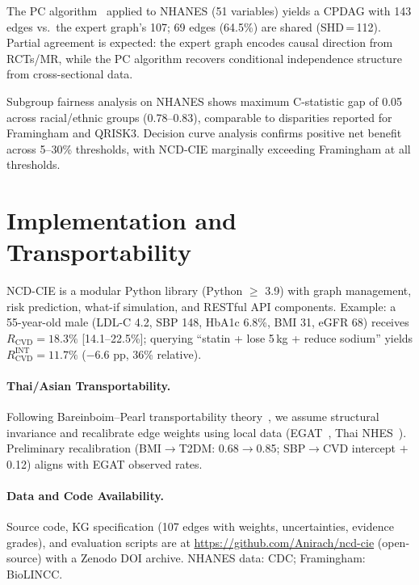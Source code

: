 \documentclass[runningheads]{llncs}
\begin{document}
The PC algorithm~\cite{spirtes2000causation} applied to NHANES
(51 variables) yields a CPDAG with 143 edges vs.\ the expert graph's
107; 69 edges (64.5\%) are shared (SHD\,=\,112).
Partial agreement is expected: the expert graph encodes causal
direction from RCTs/MR, while the PC algorithm recovers conditional
independence structure from cross-sectional data.

Subgroup fairness analysis on NHANES shows maximum C-statistic gap of
0.05 across racial/ethnic groups (0.78--0.83), comparable to
disparities reported for Framingham and QRISK3.
Decision curve analysis confirms positive net benefit across
5--30\% thresholds, with NCD-CIE marginally exceeding Framingham
at all thresholds.

\section{Implementation and Transportability}\label{sec:impl}

NCD-CIE is a modular Python library (Python $\geq$ 3.9) with
graph management, risk prediction, what-if simulation, and RESTful
API components.
Example: a 55-year-old male (LDL-C 4.2, SBP 148, HbA1c 6.8\%, BMI
31, eGFR 68) receives $R_{\text{CVD}} = 18.3\%$ [14.1--22.5\%];
querying ``statin + lose 5\,kg + reduce sodium'' yields
$R_{\text{CVD}}^{\text{INT}} = 11.7\%$ ($-$6.6 pp, 36\% relative).

\paragraph{Thai/Asian Transportability.}
Following Bareinboim--Pearl transportability
theory~\cite{bareinboim2016causal}, we assume structural invariance
and recalibrate edge weights using local data
(EGAT~\cite{sritara2003egat}, Thai NHES~\cite{aekplakorn2011thai}).
Preliminary recalibration (BMI$\to$T2DM: 0.68$\to$0.85;
SBP$\to$CVD intercept $+$0.12) aligns with EGAT observed rates.

\paragraph{Data and Code Availability.}
Source code, KG specification (107 edges with weights, uncertainties,
evidence grades), and evaluation scripts are at
\url{https://github.com/Anirach/ncd-cie} (open-source) with a
Zenodo DOI archive.
NHANES data: CDC; Framingham: BioLINCC.
\end{document}
